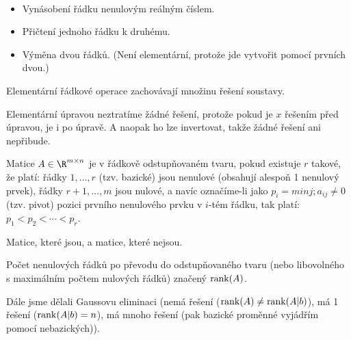 \documentclass[12pt]{article}					%
\begin{document}
    \begin{definice}
        \ 
        \begin{itemize}
            \item Vynásobení řádku nenulovým reálným číslem.
            \item Přičtení jednoho řádku k druhému.
            \item Výměna dvou řádků. (Není elementární, protože jde vytvořit pomocí prvních dvou.)
        \end{itemize}

        \begin{tvrzeniin}
            Elementární řádkové operace zachovávají množinu řešení soustavy.
            \begin{dukazin}
                Elementární úpravou neztratíme žádné řešení, protože pokud je $x$ řešením před úpravou, je i po úpravě. A naopak ho lze invertovat, takže žádné řešení ani nepřibude.
            \end{dukazin}
        \end{tvrzeniin}
    \end{definice}

    \begin{definice}
        Matice $A \in \R^{m\times n}$ je v řádkově odstupňovaném tvaru, pokud existuje $r$ takové, že platí: řádky $1,…,r$ (tzv. bazické) jsou nenulové (obsahují alespoň 1 nenulový prvek), řádky $r+1,…,m$ jsou nulové, a navíc označíme-li jako $p_i=min{j; a_{ij}\neq 0}$ (tzv. pivot) pozici prvního nenulového prvku v $i$-tém řádku, tak platí: $p_1<p_2<\cdots<p_r$.
        \begin{prikladyin}
            Matice, které jsou, a matice, které nejsou.
        \end{prikladyin}
    \end{definice}

    \begin{definice}
            Počet nenulových řádků po převodu do odstupňovaného tvaru (nebo libovolného s maximálním počtem nulových řádků) značený $\operatorname{rank}(A)$.
    \end{definice}

    Dále jsme dělali Gaussovu eliminaci (nemá řešení ($\operatorname{rank}(A) \neq \operatorname{rank}(A|b)$), má 1 řešení ($\operatorname{rank}(A|b) = n$), má mnoho řešení (pak bazické proměnné vyjádřím pomocí nebazických)).
\end{document}
